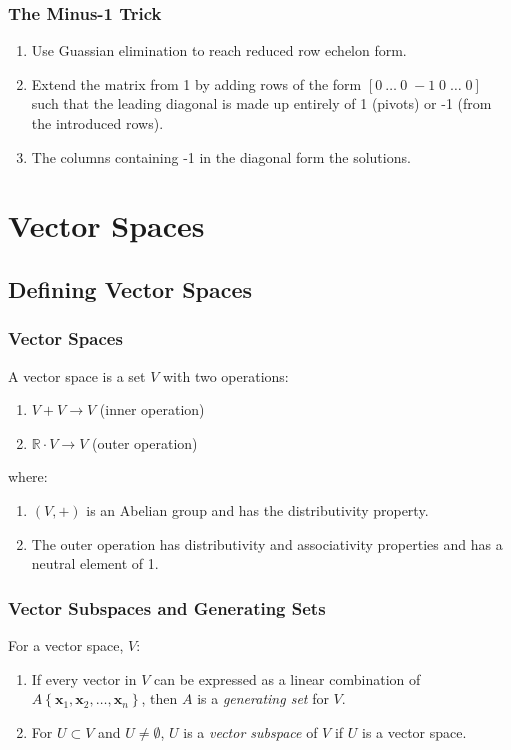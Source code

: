\documentclass[10pt,twoside,twocolumn]{article}
\newcommand{\R}[0]{\mathds{R}} %
\begin{document}
\subsubsection{The Minus-1 Trick}
\begin{enumerate}
\item Use Guassian elimination to reach reduced row echelon form. 
\item Extend the matrix from 1 by adding rows of the form $\left[0\:\dots\:0\;-1\;0\;\dots\;0\right]$
such that the leading diagonal is made up entirely of 1 (pivots) or
-1 (from the introduced rows). 
\item The columns containing -1 in the diagonal form the solutions. 
\end{enumerate}

\section{Vector Spaces}


\subsection{Defining Vector Spaces}


\subsubsection{Vector Spaces}

A vector space is a set $V$ with two operations: 
\begin{enumerate}
\item $V+V\rightarrow V$ (inner operation) 
\item $\R\cdot V\rightarrow V$ (outer operation) 
\end{enumerate}
where: 
\begin{enumerate}
\item $\left(V,+\right)$ is an Abelian group and has the distributivity
property. 
\item The outer operation has distributivity and associativity properties
and has a neutral element of 1. 
\end{enumerate}

\subsubsection{Vector Subspaces and Generating Sets}

For a vector space, $V$: 
\begin{enumerate}
\item If every vector in $V$ can be expressed as a linear combination of
$A\left\{ \mathbf{x}_{1},\mathbf{x}_{2},\dots,\mathbf{x}_{n}\right\} $,
then $A$ is a \emph{generating set} for $V$. 
\item For $U\subset V$ and $U\neq\emptyset$, $U$ is a \emph{vector subspace}
of $V$ if $U$ is a vector space. 
\end{enumerate}
\end{document}
